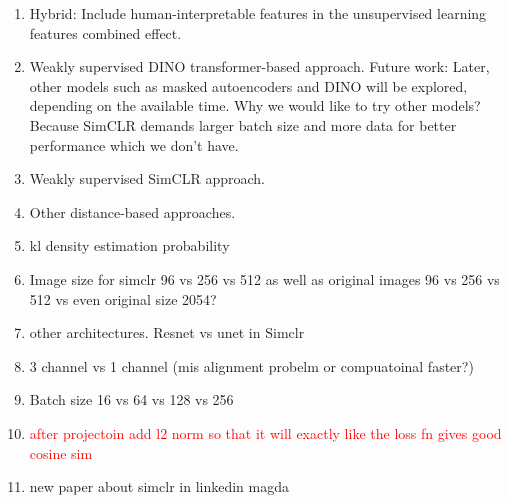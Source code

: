 \begin{enumerate}
    \item Hybrid: Include human-interpretable features in the unsupervised learning features combined effect.
    \item Weakly supervised DINO transformer-based approach. Future work: Later, other models such as masked autoencoders and DINO will be explored, depending on the available time.
	Why we would like to try other models? Because SimCLR demands larger batch size and more data for better performance which we don't have.
    \item Weakly supervised SimCLR approach.
    \item Other distance-based approaches.
    \item kl density estimation probability
    \item Image size for simclr 96 vs 256 vs 512 as well as original images 96 vs 256 vs 512 vs even original size 2054?
    \item other architectures. Resnet vs unet in Simclr
    \item 3 channel vs 1 channel (mis alignment probelm or compuatoinal faster?)
    \item Batch size 16 vs 64 vs 128 vs 256
    \item \textcolor{red}{after projectoin add l2 norm so that it will exactly like the loss fn gives good cosine sim} 
    \item new paper about simclr in linkedin magda

\end{enumerate}